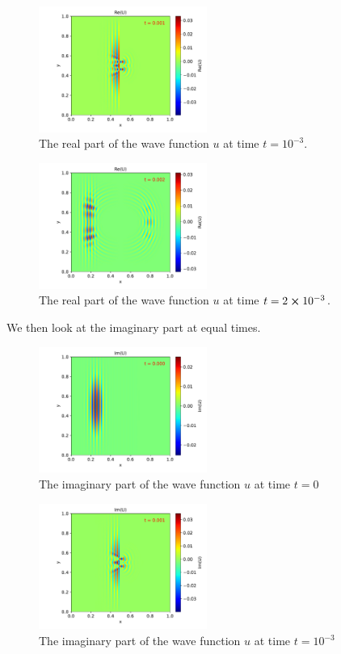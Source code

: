\documentclass[english,notitlepage,reprint,nofootinbib]{revtex4-2}  %
\begin{document}
	\begin{figure}[h!]
		\centering
		\includegraphics[width=0.49\textwidth]{figures/problem8_U_Re_0.001.pdf}
		\caption{The real part of the wave function $u$ at time $t = 10^{-3}$.}
		\label{fig:prob8_Re1}
	\end{figure}

	\begin{figure}[h!]
		\centering
		\includegraphics[width=0.49\textwidth]{figures/problem8_U_Re_0.002.pdf}
		\caption{The real part of the wave function $u$ at time $t = 2\cross10^{-3}$.}
		\label{fig:prob8_Re2}
	\end{figure}
	We then look at the imaginary part at equal times.
	\begin{figure}[h!]
		\centering
		\includegraphics[width=0.49\textwidth]{figures/problem8_U_Im_0.000.pdf}
		\caption{The imaginary part of the wave function $u$ at time $t = 0$}
		\label{fig:prob8_Im0}
	\end{figure}
	
	\begin{figure}[h!]
		\centering
		\includegraphics[width=0.49\textwidth]{figures/problem8_U_Im_0.001.pdf}
		\caption{The imaginary part of the wave function $u$ at time $t = 10^{-3}$}
		\label{fig:prob8_Im1}
	\end{figure}
	
\end{document}
